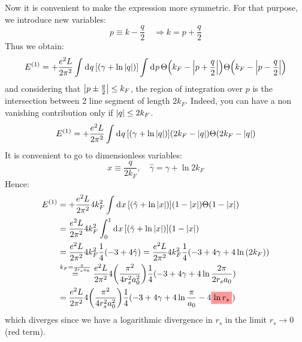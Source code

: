 \documentclass[11pt, a4paper, twoside, openright]{article}
\begin{document}
\begin{itemize}
Now it is convenient to make the expression more symmetric. For that purpose, we introduce new variables:
\begin{equation*}
  p \equiv k - \frac{q}{2} \quad \Rightarrow k = p+\frac{q}{2}
\end{equation*}
Thus we obtain:
\begin{equation*}
  E^{(1)} = + \frac{ e^2 L}{2 \pi^2}
  \int_{}^{} \dd[]{q} \qty[   \qty( \gamma + \ln{\abs{q } }  ) ]
  \int_{}^{} \dd[]{p} \Theta \qty(k_F - \abs{ p+\frac{q}{2} } )
  \Theta \qty(k_F - \abs{p-\frac{q}{2} } )
\end{equation*}
and considering that \( \abs{p\pm\frac{q}{2}} \le k_F \), the region of integration over \( p \) is the intersection between 2 line segment of length \(2 k_F \). Indeed, you can have a non vanishing contribution only if \( \abs{q } \le 2 k_F  \).
\begin{equation*}
  E^{(1)} = + \frac{ e^2 L}{2 \pi^2}
  \int_{}^{} \dd[]{q} \qty[   \qty( \gamma + \ln{\abs{q } }  ) ]
  \qty(2k_F- \abs{q} )
  \Theta \qty(2 k_F - \abs{q}  )
\end{equation*}
It is convenient to go to dimensionless variables:
\begin{equation*}
  x \equiv \frac{q}{2k_F}, \quad \hat{\gamma  } = \gamma  + \ln{2k_F}
\end{equation*}
Hence:
\begin{equation}
\begin{split}
  E^{(1)} &= + \frac{ e^2 L}{2 \pi^2} 4 k_F^2
  \int_{}^{} \dd[]{x} \qty[   \qty( \hat{\gamma  }  + \ln{\abs{ x } }  ) ]
  \qty(1- \abs{x} )
  \Theta \qty(1- \abs{x} ) \\
  &=\frac{ e^2 L}{2 \pi^2} 4 k_F^2
  \int_{0}^{1} \dd[]{x} \qty[   \qty( \hat{\gamma  }  + \ln{\abs{ x } }  ) ]
  \qty(1- \abs{x} ) \\
  &= \frac{ e^2 L}{2 \pi^2} 4 k_F^2 \frac{1}{4} (-3 + 4 \hat{\gamma  } ) =
  \frac{ e^2 L}{2 \pi^2} 4 k_F^2 \frac{1}{4} (-3 + 4 \gamma  + 4\ln{(2k_F)} ) \\
  & \overset{k_F = \frac{\pi}{2 r_s a_0}}{=}
   \frac{ e^2 L}{2 \pi^2} 4 \qty(\frac{\pi ^2}{4 r_s^2 a_0^2} )  \frac{1}{4} (-3 + 4 \gamma  + 4\ln{\frac{2 \pi}{2 r_s a_0}} ) \\
   &=
   \frac{ e^2 L}{2 \pi^2} 4 \qty(\frac{\pi ^2}{4 r_s^2 a_0^2} )  \frac{1}{4} (-3 + 4 \gamma  + 4\ln{\frac{ \pi}{ a_0}}  - 4 \mathcolorbox{red!40}{\ln{r_s}} )
\end{split}
\end{equation}
which diverges since we have a logarithmic divergence in \( r_s\) in the limit \(r_s \rightarrow 0 \) (red term).


















\end{itemize}
\end{document}
